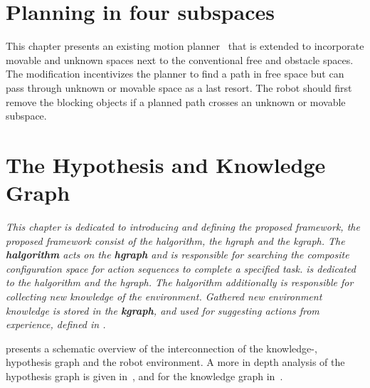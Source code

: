 \chapter{Planning in four subspaces}%
\label{chap:proposed_planning}
This chapter presents an existing motion planner~\cite{chen_fast_2018} that is extended to incorporate movable and unknown spaces next to the conventional free and obstacle spaces. The modification incentivizes the planner to find a path in free space but can pass through unknown or movable space as a last resort. The robot should first remove the blocking objects if a planned path crosses an unknown or movable subspace.\bs




\chapter{The Hypothesis and Knowledge Graph}%
\label{chap:hgraph_and_kgraph}

\textit{This chapter is dedicated to introducing and defining the proposed framework, the proposed framework consist of the \acl{halgorithm}, the \acl{hgraph} and the \acl{kgraph}. The \textbf{\acf{halgorithm}} acts on the \textbf{\acf{hgraph}} and is responsible for searching the composite configuration space for action sequences to complete a specified task.  is dedicated to the \ac{halgorithm} and the \ac{hgraph}. The \ac{halgorithm} additionally is responsible for collecting new knowledge of the environment. Gathered new environment knowledge is stored in the \textbf{\acl{kgraph}}, and used for suggesting actions from experience, defined in .\bs}

 presents a schematic overview of the interconnection of the knowledge-, hypothesis graph and the robot environment. A more in depth analysis of the hypothesis graph is given in~, and for the knowledge graph in~.\bs

